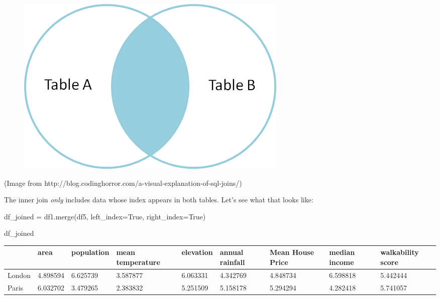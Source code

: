 \documentclass[
  letterpaper,
  DIV=11,
  numbers=noendperiod]{scrreprt}
\newenvironment{Shaded}{\begin{snugshade}}{\end{snugshade}}
\newcommand{\NormalTok}[1]{\textcolor[rgb]{0.00,0.23,0.31}{#1}}
\newcommand{\OperatorTok}[1]{\textcolor[rgb]{0.37,0.37,0.37}{#1}}
\newcommand{\VariableTok}[1]{\textcolor[rgb]{0.07,0.07,0.07}{#1}}
\begin{document}
\begin{figure}[H]

{\centering \includegraphics{notebooks/W05. Merging and Joining_files/figure-pdf/cell-33-output-1.png}

}

\end{figure}

(Image from
http://blog.codinghorror.com/a-visual-explanation-of-sql-joins/)

The inner join \emph{only} includes data whose index appears in both
tables. Let's see what that looks like:

\begin{Shaded}
\begin{Highlighting}[]
\NormalTok{df\_joined }\OperatorTok{=}\NormalTok{ df1.merge(df5, left\_index}\OperatorTok{=}\VariableTok{True}\NormalTok{, right\_index}\OperatorTok{=}\VariableTok{True}\NormalTok{)}
\end{Highlighting}
\end{Shaded}

\begin{Shaded}
\begin{Highlighting}[]
\NormalTok{df\_joined}
\end{Highlighting}
\end{Shaded}

\begin{longtable}[]{@{}lllllllll@{}}
\toprule\noalign{}
& area & population & mean temperature & elevation & annual rainfall &
Mean House Price & median income & walkability score \\
\midrule\noalign{}
\endhead
\bottomrule\noalign{}
\endlastfoot
London & 4.898594 & 6.625739 & 3.587877 & 6.063331 & 4.342769 & 4.848734
& 6.598818 & 5.442444 \\
Paris & 6.032702 & 3.479265 & 2.383832 & 5.251509 & 5.158178 & 5.294294
& 4.282418 & 5.741057 \\
\end{longtable}
\end{document}
